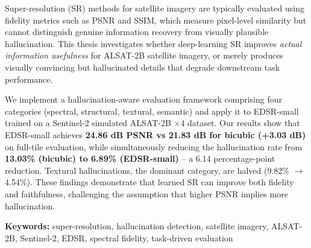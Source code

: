 Super-resolution (SR) methods for satellite imagery are typically evaluated using fidelity metrics such as PSNR and SSIM, which measure pixel-level similarity but cannot distinguish genuine information recovery from visually plausible hallucination. This thesis investigates whether deep-learning SR improves \emph{actual information usefulness} for ALSAT-2B satellite imagery, or merely produces visually convincing but hallucinated details that degrade downstream task performance.

We implement a hallucination-aware evaluation framework comprising four categories (spectral, structural, textural, semantic) and apply it to EDSR-small trained on a Sentinel-2 simulated ALSAT-2B $\times$4 dataset. Our results show that EDSR-small achieves \textbf{24.86 dB PSNR vs 21.83 dB for bicubic (+3.03 dB)} on full-tile evaluation, while simultaneously reducing the hallucination rate from \textbf{13.03\% (bicubic) to 6.89\% (EDSR-small)} -- a 6.14 percentage-point reduction. Textural hallucinations, the dominant category, are halved (9.82\% $\to$ 4.54\%). These findings demonstrate that learned SR can improve both fidelity and faithfulness, challenging the assumption that higher PSNR implies more hallucination.

\begin{center}
\textbf{Keywords:} super-resolution, hallucination detection, satellite imagery, ALSAT-2B, Sentinel-2, EDSR, spectral fidelity, task-driven evaluation
\end{center}
